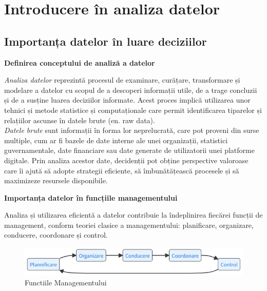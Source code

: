 \documentclass[
  11pt,
  b5paper,
  nottoc]{book}
\begin{document}

\hypertarget{cap1}{%
\chapter{Introducere în analiza datelor}\label{cap1}}

\hypertarget{importanux21ba-datelor-uxeen-luare-deciziilor}{%
\section{Importanța datelor în luare
deciziilor}\label{importanux21ba-datelor-uxeen-luare-deciziilor}}

\textbf{Definirea conceptului de analiză a datelor}

\emph{Analiza datelor} reprezintă procesul de examinare, curățare,
transformare și modelare a datelor cu scopul de a descoperi informații
utile, de a trage concluzii și de a susține luarea deciziilor informate.
Acest proces implică utilizarea unor tehnici și metode statistice și
computaționale care permit identificarea tiparelor și relațiilor ascunse
în datele brute (en. raw data).\\
\emph{Datele brute} sunt informații în forma lor neprelucrată, care pot
proveni din surse multiple, cum ar fi bazele de date interne ale unei
organizații, statistici guvernamentale, date financiare sau date
generate de utilizatorii unei platforme digitale. Prin analiza acestor
date, decidenții pot obține perspective valoroase care îi ajută să
adopte strategii eficiente, să îmbunătățească procesele și să maximizeze
resursele disponibile.

\textbf{Importanța datelor în funcțiile managementului}

Analiza și utilizarea eficientă a datelor contribuie la îndeplinirea
fiecărei funcții de management, conform teoriei clasice a
managementului: planificare, organizare, conducere, coordonare și
control.

\begin{figure}

{\centering \includegraphics{images/functii_management.png}

}

\caption{Functiile Managementului}

\end{figure}
\end{document}
